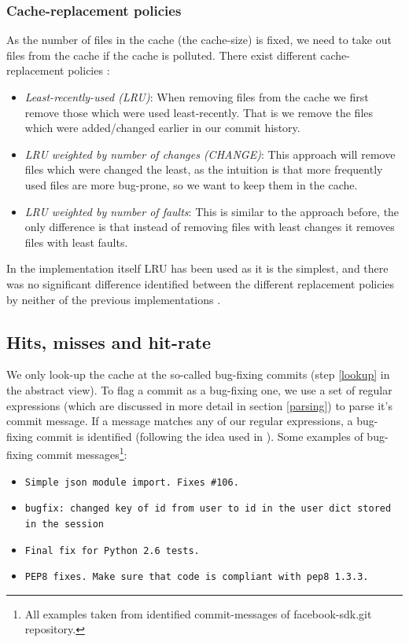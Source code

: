 \documentclass[12pt,twoside,notitlepage]{report}
\begin{document}
\subsubsection*{Cache-replacement policies}
As the number of files in the cache (the cache-size) is fixed, we need to take out files from the cache if the cache is polluted. There exist different cache-replacement policies \cite{FixCache}:
\begin{itemize}
\item \textit{Least-recently-used (LRU)}: When removing files from the cache we first remove those which were used least-recently. That is we remove the files which were added/changed earlier in our commit history.
\item \textit{LRU weighted by number of changes (CHANGE)}: This approach will remove files which were changed the least, as the intuition is that more frequently used files are more bug-prone, so we want to keep them in the cache.
\item \textit{LRU weighted by number of faults}: This is similar to the approach before, the only difference is that instead of removing files with least changes it removes files with least faults.
\end{itemize}
In the implementation itself LRU has been used as it is the simplest, and there was no significant difference identified between the different replacement policies by neither of the previous implementations \cite{FixCache}\cite{Sadowski}\cite{Bugcache}.
\subsection{Hits, misses and hit-rate}
We only look-up the cache at the so-called bug-fixing commits (step \ref{lookup} in the abstract view). To flag a commit as a bug-fixing one, we use a set of regular expressions (which are discussed in more detail in section \ref{parsing}) to parse it's commit message. If a message matches any of our regular expressions, a bug-fixing commit is identified  (following the idea used in \cite{KimZim}).
Some examples of bug-fixing commit messages\footnote{All examples taken from identified commit-messages of facebook-sdk.git repository.}:
\begin{itemize}
\item \texttt{Simple json module import. Fixes \#106.}

\item \texttt{bugfix: changed key of id from user to id in the user dict stored in the session}
\item \texttt{Final fix for Python 2.6 tests.}
\item \texttt{PEP8 fixes. Make sure that code is compliant with pep8 1.3.3.}
\end{itemize}
\end{document}
